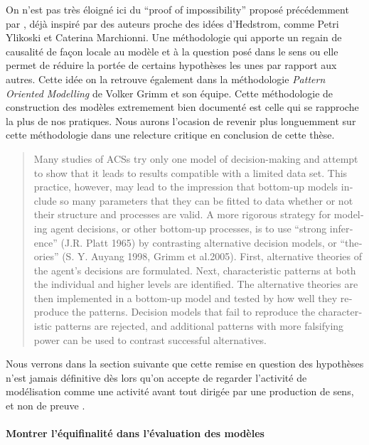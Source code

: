 On n'est pas très éloigné ici du \foreignquote{english}{proof of impossibility} proposé précédemment par \textcite{Cottineau2014b}, déjà inspiré par des auteurs proche des idées d'Hedstrom, comme Petri Ylikoski et Caterina Marchionni. Une méthodologie qui apporte un regain de causalité de façon locale au modèle et à la question posé dans le sens ou elle permet de réduire la portée de certains hypothèses les unes par rapport aux autres. Cette idée on la retrouve également dans la méthodologie \textit{Pattern Oriented Modelling} de Volker Grimm \autocites{Grimm2005, Railsback2012} et son équipe. Cette méthodologie de construction des modèles extremement bien documenté \autocite{Grimm2011} est celle qui se rapproche la plus de nos pratiques. Nous aurons l'ocasion de revenir plus longuemment sur cette méthodologie dans une relecture critique en conclusion de cette thèse.

\foreignblockquote{english}[\cite{Grimm2005}]{Many studies of ACSs try only one model of decision-making and attempt to show that it leads to results compatible with a limited data set. This practice, however, may lead to the impression that bottom-up models include so many parameters that they can be fitted to data whether or not their structure and processes are valid. A more rigorous strategy for modeling agent decisions, or other bottom-up processes, is to use \enquote{strong inference} (J.R. Platt 1965) by contrasting alternative decision models, or \enquote{theories} (S. Y. Auyang 1998, Grimm et al.2005). First, alternative theories of the agent’s decisions are formulated. Next, characteristic patterns at both the individual and higher levels are identified. The alternative theories are then implemented in a bottom-up model and tested by how well they reproduce the patterns. Decision models that fail to reproduce the characteristic patterns are rejected, and additional patterns with more falsifying power can be used to contrast successful alternatives.}

Nous verrons dans la section suivante que cette remise en question des hypothèses n'est jamais définitive dès lors qu'on accepte de regarder l'activité de modélisation comme une activité avant tout dirigée par une production de sens, et non de preuve \autocite{Besse2000}.


\paragraph{Montrer l'équifinalité dans l'évaluation des modèles}

